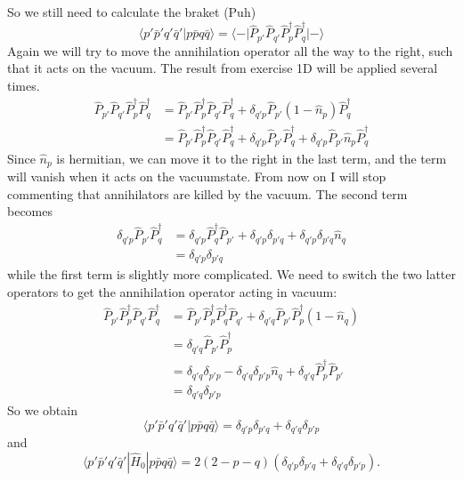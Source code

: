 \documentclass[norsk,a4paper,12pt]{article}
\begin{document}
So we still need to calculate the braket (Puh)
\begin{equation}
\langle p'\bar{p}'q'\bar{q}'|p\bar{p}q\bar{q}\rangle=\langle-|\hat{P}_{p'}\hat{P}_{q'}\hat{P}_p^{\dagger}\hat{P}_q^{\dagger}|-\rangle
\end{equation}
Again we will try to move the annihilation operator all the way to the right, such that it acts on the vacuum. The result from exercise 1D will be applied several times.
\begin{align}
\hat{P}_{p'}\hat{P}_{q'}\hat{P}_p^{\dagger}\hat{P}_q^{\dagger}&=\hat{P}_{p'}\hat{P}_p^{\dagger}\hat{P}_{q'}\hat{P}_q^{\dagger}+\delta_{q'p}\hat{P}_{p'}(1-\hat{n}_p)\hat{P}_q^{\dagger}\\
&=\hat{P}_{p'}\hat{P}_p^{\dagger}\hat{P}_{q'}\hat{P}_q^{\dagger}+\delta_{q'p}\hat{P}_{p'}\hat{P}_q^{\dagger}+\delta_{q'p}\hat{P}_{p'}\hat{n}_p\hat{P}_q^{\dagger}
\end{align}
Since $\hat{n}_p$ is hermitian, we can move it to the right in the last term, and the term will vanish when it acts on the vacuumstate. From now on I will stop commenting that annihilators are killed by the vacuum. The second term becomes
\begin{align}
\delta_{q'p}\hat{P}_{p'}\hat{P}_q^{\dagger}&=\delta_{q'p}\hat{P}_q^{\dagger}\hat{P}_{p'}+\delta_{q'p}\delta_{p'q}+\delta_{q'p}\delta_{p'q}\hat{n}_q\\
&=\delta_{q'p}\delta_{p'q}
\end{align}
while the first term is slightly more complicated. We need to switch the two latter operators to get the annihilation operator acting in vacuum:
\begin{align}
\hat{P}_{p'}\hat{P}_p^{\dagger}\hat{P}_{q'}\hat{P}_q^{\dagger}&=\hat{P}_{p'}\hat{P}_p^{\dagger}\hat{P}_{q}^{\dagger}\hat{P}_{q'}+\delta_{q'q}\hat{P}_{p'}\hat{P}_p^{\dagger}(1-\hat{n}_q)\\
&=\delta_{q'q}\hat{P}_{p'}\hat{P}_p^{\dagger}\\
&=\delta_{q'q}\delta_{p'p}-\delta_{q'q}\delta_{p'p}\hat{n}_q+\delta_{q'q}\hat{P}_p^{\dagger}\hat{P}_{p'}\\
&=\delta_{q'q}\delta_{p'p}
\end{align}
So we obtain
\begin{equation}
\langle p'\bar{p}'q'\bar{q}'|p\bar{p}q\bar{q}\rangle=\delta_{q'p}\delta_{p'q}+\delta_{q'q}\delta_{p'p}
\end{equation}
and 
\begin{equation}
\langle p'\bar{p}'q'\bar{q}'|\hat{H}_0|p\bar{p}q\bar{q}\rangle=2(2-p-q)(\delta_{q'p}\delta_{p'q}+\delta_{q'q}\delta_{p'p}).
\end{equation}
\end{document}
